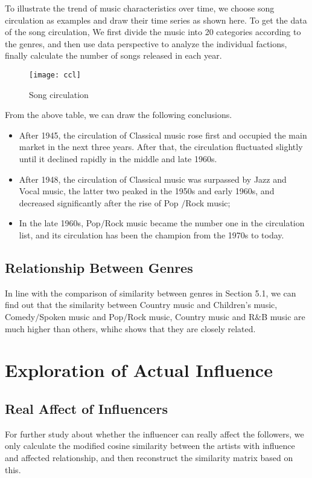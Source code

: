 \documentclass{mcmthesis}
\begin{document}
 To illustrate the trend of music characteristics over time, we choose song circulation as examples and draw their time series as shown here. To get the data of the song circulation, We first divide the music into 20 categories according to the genres, and then use data perspective to analyze the individual factions, finally calculate the number of songs released in each year.
 \begin{figure}[H]%
 	\small
 	\centering
 	\texttt{[image: ccl]}%
 	\caption{Song circulation}\label{fig:7}%
 \end{figure}
 From the above table, we can draw the following conclusions.
 \begin{itemize}
 	\item After 1945, the circulation of Classical music rose first and occupied the main market in the next three years. After that, the circulation fluctuated slightly until it declined rapidly in the middle and late 1960s.
 	\item After 1948, the circulation of Classical music was surpassed by Jazz and Vocal music, the latter two peaked in the 1950s and early 1960s, and decreased significantly after the rise of Pop $/$Rock music;
 	\item In the late 1960s, Pop$/$Rock music became the number one in the circulation list, and its circulation has been the champion from the 1970s to today. 
 \end{itemize}
\subsection{Relationship Between Genres}
 In line with the comparison of similarity between genres in Section 5.1, we can find out that the similarity between Country music and Children's music, Comedy$/$Spoken music and Pop$/$Rock music, Country music and R$\&$B music are much higher than others, whihc shows that they are closely related.
\section{Exploration of Actual Influence}
\subsection{Real Affect of Influencers}
For further study about whether the influencer can really affect the followers, we only calculate the modified cosine similarity between the artists with influence and affected relationship, and then reconstruct the similarity matrix based on this.
\end{document}
